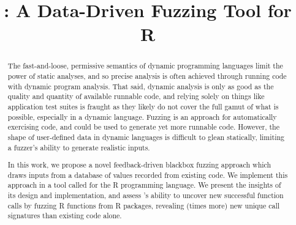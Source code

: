 \documentclass[sigplan,anonymous,review]{acmart}
\begin{document}
\title{\tool: A Data-Driven Fuzzing Tool for R}

\begin{abstract}

The fast-and-loose, permissive semantics of dynamic programming languages limit the power of static analyses, and so precise analysis is often achieved through running code with dynamic program analysis. 
That said, dynamic analysis is only as good as the quality and quantity of available runnable code, and relying solely on things like application test suites is fraught as they likely do not cover the full gamut of what is possible, especially in a dynamic language.
Fuzzing is an approach for automatically exercising code, and could be used to generate yet more runnable code.
However, the shape of user-defined data in dynamic languages is difficult to glean statically, limiting a fuzzer's ability to generate realistic inputs.

In this work, we propose a novel feedback-driven blackbox fuzzing approach which draws inputs from a database of values recorded from existing code.
We implement this approach in a tool called \tool for the R programming language.
We present the insights of its design and implementation, and assess \tool's ability to uncover new successful function calls by fuzzing \UFNumFunctions R functions from \UFNumPackages R packages, revealing \UFSignatrSignatures (\UFSignatrBaselineSignaturesRatio times more) new unique call signatures than existing code alone.


%
%




\end{abstract}
\end{document}
